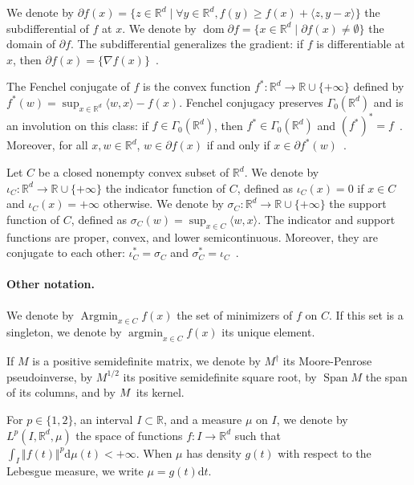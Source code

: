 \documentclass[11pt,english,reqno]{article}
\DeclareMathOperator*{\argmin}{argmin}
\DeclareMathOperator{\Span}{Span}
\let\ker\relax
\DeclareMathOperator{\ker}{Ker}
\DeclareMathOperator{\dom}{dom}
\DeclareMathOperator{\Argmin}{Argmin}
\newcommand{\diff}{\mathrm{d}}
\newcommand{\R}{\mathbb{R}}
\renewcommand{\geq}{\geqslant}
\theoremstyle{plain}
\theoremstyle{definition}
\theoremstyle{remark}
\numberwithin{equation}{section}
\begin{document}
We denote by $\partial f(x) = \{ z \in \R^d \mid \forall y \in \R^d, f(y) \geq f(x) + \langle z , y-x \rangle \}$ the subdifferential of $f$ at $x$. We denote by $\dom \partial f = \{x \in \R^d \mid \partial f(x) \neq \emptyset\}$ the domain of $\partial f$. The subdifferential generalizes the gradient: if $f$ is differentiable at $x$, then $\partial f(x) = \{ \nabla f(x) \}$~\cite[Prop.~17.31]{bauschke2017convex}.

The Fenchel conjugate of $f$ is the convex function $f^*: \R^d \to \R \cup \{+\infty\}$ defined by $f^*(w) = \sup_{x \in \R^d} \langle w , x \rangle - f(x)$. Fenchel conjugacy preserves $\Gamma_0(\R^d)$ and is an involution on this class: if $f \in \Gamma_0(\R^d)$, then $f^* \in \Gamma_0(\R^d)$ and $(f^*)^* = f$~\cite[Coro.~12.2.1]{rockafellar1970convex}. Moreover, for all $x,w \in \R^d$, $w \in \partial f(x)$ if and only if $x \in \partial f^*(w)$~\cite[Coro.~16.30]{bauschke2017convex}.

Let $C$ be a closed nonempty convex subset of $\R^d$. We denote by $\iota_C : \R^d \to \R \cup \{+\infty\}$ the indicator function of $C$, defined as $\iota_C(x) = 0$ if $x \in C$ and $\iota_C(x) = +\infty$ otherwise. We denote by $\sigma_C : \R^d \to \R \cup \{+\infty\}$ the support function of $C$, defined as $\sigma_C(w) = \sup_{x \in C} \langle w , x \rangle$. The indicator and support functions are proper, convex, and lower semicontinuous. Moreover, they are conjugate to each other: $\iota_C^* = \sigma_C$ and $\sigma_C^* = \iota_C$~\cite[Thm.~13.2]{rockafellar1970convex}. 

\paragraph{Other notation.} We denote by $\Argmin_{x \in C} f(x)$ the set of minimizers of $f$ on $C$. If this set is a singleton, we denote by $\argmin_{x \in C} f(x)$ its unique element.

If $M$ is a positive semidefinite matrix, we denote by $M^\dagger$ its Moore-Penrose pseudoinverse, by $M^{1/2}$ its positive semidefinite square root, by $\Span M$ the span of its columns, and by $\ker M$ its kernel.

For $p \in \{1,2\}$, an interval $I \subset \R$, and a measure $\mu$ on $I$, we denote by $L^p(I,\R^d,\mu)$ the space of functions $f : I \to \R^d$ such that $\int_I \Vert f(t) \Vert^p \diff \mu(t) < +\infty$. When $\mu$ has density $g(t)$ with respect to the Lebesgue measure, we write $\mu = g(t) \diff t$.
\end{document}
